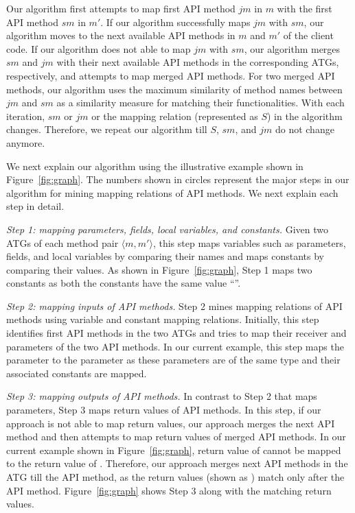 Our algorithm first attempts to map first API method $jm$ in $m$
with the first API method $sm$ in $m'$. If our algorithm successfully maps $jm$ with
$sm$, our algorithm moves to the next available API methods in $m$
and $m'$ of the client code. If our algorithm does not able to map $jm$
with $sm$, our algorithm merges $sm$ and $jm$ with their next available API methods
in the corresponding ATGs, respectively, and attempts to map merged API methods.
For two merged API methods, our algorithm uses the
maximum similarity of method names between $jm$ and $sm$ as a
similarity measure for matching their functionalities.
With each iteration, $sm$ or $jm$ or the mapping relation (represented as $S$)
in the algorithm changes. Therefore, we repeat our algorithm
till $S$, $sm$, and $jm$ do not change anymore.

We next explain our algorithm using the illustrative example shown
in Figure~\ref{fig:graph}. The numbers shown in circles
represent the major steps in our algorithm for mining mapping
relations of API methods. We next explain each step in detail.

\emph{Step 1: mapping parameters, fields, local variables, and constants.}
Given two ATGs of each method pair $\langle m, m' \rangle$, this step maps
variables such as parameters, fields, and local variables by comparing their names
and maps constants by comparing their values. As shown in
Figure~\ref{fig:graph}, Step 1 maps two constants as both the constants
have the same value ``''.

\emph{Step 2: mapping inputs of API methods.} Step 2 mines mapping
relations of API methods using variable and constant mapping relations.
Initially, this step identifies first API methods in the two ATGs and tries to
map their receiver and parameters of the two API methods.
In our current example, this step maps the parameter 
to the parameter  as these parameters
are of the same type and their associated constants are mapped.

\emph{Step 3: mapping outputs of API methods.} In contrast to Step 2
that maps parameters, Step 3 maps return values of API methods. In
this step, if our approach is not able to map return values, our
approach merges the next API method and then attempts to map return
values of merged API methods. In our current example shown in
Figure~\ref{fig:graph}, return value of
 cannot be mapped to the
return value of . Therefore, our
approach merges next API methods in the ATG till the 
API method, as the return values (shown as ) match
only after the  API method. Figure~\ref{fig:graph}
shows Step 3 along with the matching return values.

